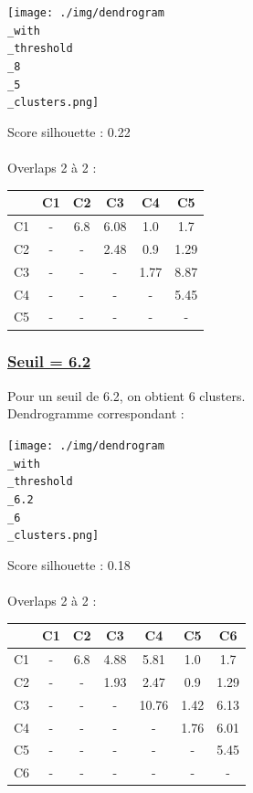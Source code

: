 \documentclass{article}
\begin{document}
\begin{center}
    \texttt{[image: ./img/dendrogram\\\_with\\\_threshold\\\_8\\\_5\\\_clusters.png]}
\end{center}

\noindent Score silhouette : 0.22\\\\
Overlaps 2 à 2 :\\

\begin{center}
\begin{tabular}{|c|c|c|c|c|c|}
\hline
& C1 & C2 & C3 & C4 & C5 \\
\hline
C1 & - & 6.8 & 6.08 & 1.0 & 1.7 \\
\hline
C2 & - & - & 2.48 & 0.9 & 1.29 \\
\hline
C3 & - & - & - & 1.77 & 8.87 \\
\hline
C4 & - & - & - & - & 5.45 \\
\hline
C5 & - & - & - & - & - \\
\hline
\end{tabular}
\end{center}

\subsubsection*{\underline{Seuil = 6.2}}
Pour un seuil de 6.2, on obtient 6 clusters.\\
Dendrogramme correspondant :

\begin{center}
    \texttt{[image: ./img/dendrogram\\\_with\\\_threshold\\\_6.2\\\_6\\\_clusters.png]}
\end{center}

\noindent Score silhouette : 0.18\\\\
Overlaps 2 à 2 :\\

\begin{center}
\begin{tabular}{|c|c|c|c|c|c|c|}
\hline
& C1 & C2 & C3 & C4 & C5 & C6 \\
\hline
C1 & - & 6.8 & 4.88 & 5.81 & 1.0 & 1.7 \\
\hline
C2 & - & - & 1.93 & 2.47 & 0.9 & 1.29 \\
\hline
C3 & - & - & - & 10.76 & 1.42 & 6.13 \\
\hline
C4 & - & - & - & - & 1.76 & 6.01 \\
\hline
C5 & - & - & - & - & - & 5.45 \\
\hline
C6 & - & - & - & - & - & - \\
\hline
\end{tabular}
\end{center}
\end{document}
